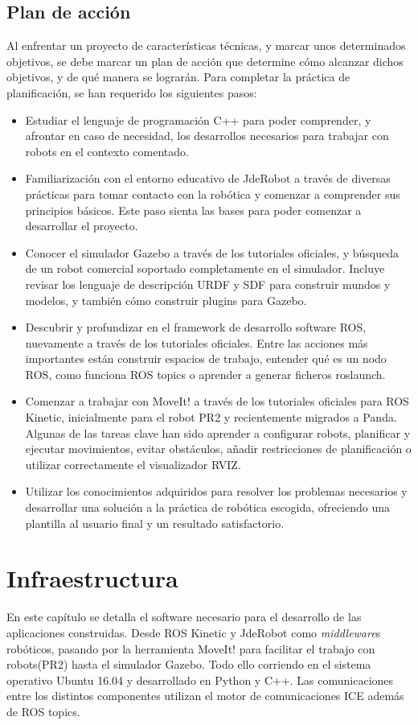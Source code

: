 \documentclass[12pt,spanish,chapterprefix, numbers=noenddot]{book}
\numberwithin{equation}{section}
\numberwithin{figure}{section}
\begin{document}
\section{Plan de acción}
Al enfrentar un proyecto de características técnicas, y marcar unos determinados objetivos, se debe marcar un plan de acción que determine cómo alcanzar dichos objetivos, y de qué manera se lograrán. Para completar la práctica de planificación, se han requerido los siguientes pasos: 
\begin{itemize}
    \item Estudiar el lenguaje de programación C++ para poder comprender, y afrontar en caso de necesidad, los desarrollos necesarios para trabajar con robots en el contexto comentado. 
    \item Familiarización con el entorno educativo de JdeRobot a través de diversas prácticas para tomar contacto con la robótica y comenzar a comprender sus principios básicos. Este paso sienta las bases para poder comenzar a desarrollar el proyecto. 
    \item Conocer el simulador Gazebo a través de los tutoriales oficiales, y búsqueda de un robot comercial soportado completamente en el simulador. Incluye revisar los lenguaje de descripción URDF y SDF para construir mundos y modelos, y también cómo construir plugins para Gazebo. 
    \item Descubrir y profundizar en el framework de desarrollo software ROS, nuevamente a través de los tutoriales oficiales. Entre las acciones más importantes están construir espacios de trabajo, entender qué es un nodo ROS, como funciona ROS topics o aprender a generar ficheros roslaunch.
    \item Comenzar a trabajar con MoveIt! a través de los tutoriales oficiales para ROS Kinetic, inicialmente para el robot PR2 y recientemente migrados a Panda. Algunas de las tareas clave han sido aprender a configurar robots, planificar y ejecutar movimientos, evitar obstáculos, añadir restricciones de planificación o utilizar correctamente el visualizador RVIZ. 
    \item Utilizar los conocimientos adquiridos para resolver los problemas necesarios y desarrollar una solución a la práctica de robótica escogida, ofreciendo una plantilla al usuario final y un resultado satisfactorio. 
\end{itemize}

\chapter{Infraestructura}
En este capítulo se detalla el software necesario para el desarrollo de las aplicaciones construidas. Desde ROS Kinetic y JdeRobot como \textit{middleware}s robóticos, pasando por la herramienta MoveIt! para facilitar el trabajo con robots(PR2) hasta el simulador Gazebo. Todo ello corriendo en el sistema operativo Ubuntu 16.04 y desarrollado en Python y C++.  Las comunicaciones entre los distintos componentes utilizan el motor de comunicaciones ICE además de ROS topics. 
\end{document}
